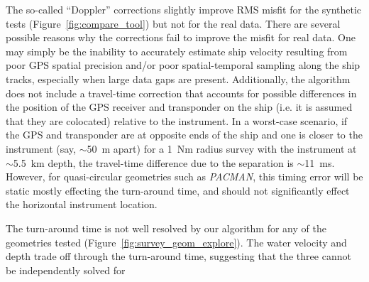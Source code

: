 The so-called ``Doppler'' corrections slightly improve RMS misfit for the synthetic tests (Figure~\ref{fig:compare_tool}) but not for the real data. There are several possible reasons why the corrections fail to improve the misfit for real data. One may simply be the inability to accurately estimate ship velocity resulting from poor GPS spatial precision and/or poor spatial-temporal sampling along the ship tracks, especially when large data gaps are present. Additionally, the algorithm does not include a travel-time correction that accounts for possible differences in the position of the GPS receiver and transponder on the ship (i.e. it is assumed that they are colocated) relative to the instrument. In a worst-case scenario, if the GPS and transponder are at opposite ends of the ship and one is closer to the instrument (say, $\sim$50~m apart) for a 1~Nm radius survey with the instrument at $\sim$5.5~km depth, the travel-time difference due to the separation is $\sim$11~ms. However, for quasi-circular geometries such as \textit{PACMAN}, this timing error will be static mostly effecting the turn-around time, and should not significantly effect the horizontal instrument location.

The turn-around time is not well resolved by our algorithm for any of the geometries tested (Figure~\ref{fig:survey_geom_explore}). The water velocity and depth trade off through the turn-around time, suggesting that the three cannot be independently solved for